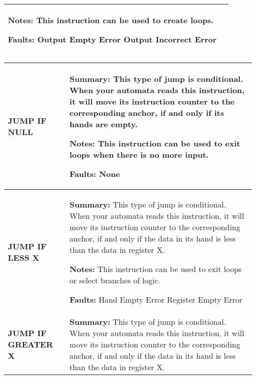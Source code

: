 \begin{center}
\begin{tabular}{ | m{3cm} | m{11cm} | }
            \textbf{Notes:} 
            \newline This instruction can be used to create loops.

            \textbf{Faults:}
            \newline Output Empty Error
            \newline Output Incorrect Error\\ 
        \hline
    \end{tabular}

    \begin{tabular}{ | m{3cm} | m{11cm} | } 
        \hline
            \begin{center}
                \textbf{JUMP IF NULL} 
            \end{center}& 
            \textbf{Summary:} 
            \newline This type of jump is conditional. When your automata reads this instruction, it will move its instruction counter 
            to the corresponding anchor, if and only if its hands are empty.

            \textbf{Notes:} 
            \newline This instruction can be used to exit loops when there is no more input.

            \textbf{Faults:}
            \newline None\\
        \hline
            \begin{center}
                \textbf{JUMP IF LESS X} 
            \end{center}& 
            \textbf{Summary:} 
            \newline This type of jump is conditional. When your automata reads this instruction, it will move its 
            instruction counter to the corresponding anchor, if and only if the data in its hand is less than the data in register X.

            \textbf{Notes:} 
            \newline This instruction can be used to exit loops or select branches of logic.

            \textbf{Faults:}
            \newline Hand Empty Error
            \newline Register Empty Error\\
        \hline
            \begin{center}
                \textbf{JUMP IF GREATER X} 
            \end{center}& 
            \textbf{Summary:} 
            \newline This type of jump is conditional. When your automata reads this instruction, it will move its instruction counter 
            to the corresponding anchor, if and only if the data in its hand is less than the data in register X.


\end{tabular}
\end{center}

